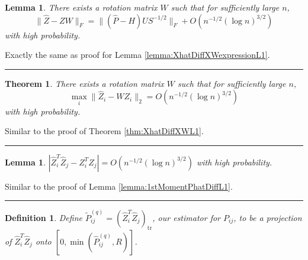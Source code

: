 \documentclass[a4paper]{article}
\newenvironment{proof}{{\bf Proof:  }}{\hfill\rule{2mm}{2mm}}
\newtheorem{lemma}[fact]{Lemma}
\newtheorem{theorem}[fact]{Theorem}
\newtheorem{definition}[fact]{Definition}
\renewcommand{\hat}{\widehat}
\begin{document}
\begin{lemma}
\label{lemma:XhatDiffXWexpression}
There exists a rotation matrix $W$ such that for sufficiently large $n$,
\[
	\|\hat{Z} - Z W\|_F = \| (\hat{P} - H) U S^{-1/2} \|_F + O(n^{-1/2} (\log n)^{3/2})
\]
with high probability.
\end{lemma}
\begin{proof}
Exactly the same as proof for Lemma \ref{lemma:XhatDiffXWexpressionL1}.
\end{proof}

\begin{theorem}
\label{thm:XhatDiffXW}
There exists a rotation matrix $W$ such that for sufficiently large $n$,
\[
	\max_i \| \hat{Z}_i - W Z_i \|_2 = O(n^{-1/2} (\log n)^{3/2})
\]
with high probability.
\end{theorem}
\begin{proof}
Similar to the proof of Theorem \ref{thm:XhatDiffXWL1}.
\end{proof}

\begin{lemma}
\label{lemma:1stMomentPhatDiffLq}
$\left|  \hat{Z}_i^T \hat{Z}_j - Z_i^T Z_j \right| = O(n^{-1/2} (\log n)^{3/2})$ with high probability.
\end{lemma}
\begin{proof}
Similar to the proof of Lemma \ref{lemma:1stMomentPhatDiffL1}.
\end{proof}

\begin{definition}
Define $\widetilde{P}_{ij}^{(q)} = (\hat{Z}_i^T \hat{Z}_j)_{\mathrm{tr}}$, our estimator for $P_{ij}$, to be a projection of $\hat{Z}_i^T \hat{Z}_j$ onto $[0, \min(\hat{P}_{ij}^{(q)}, R)]$.
\end{definition}
\end{document}
